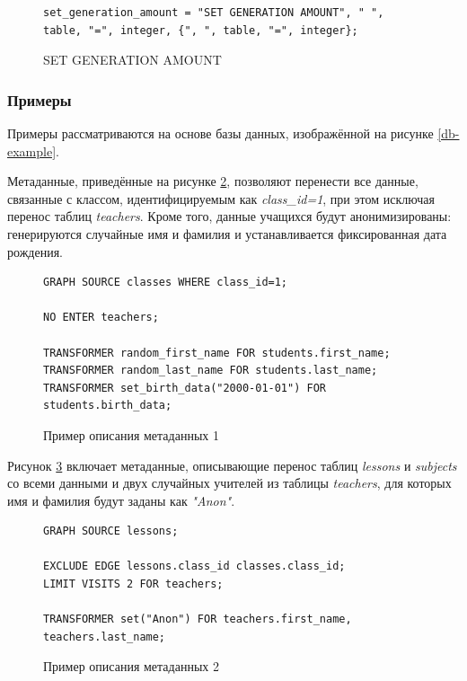 \begin{figure}
  \begin{lstlisting}
set_generation_amount = "SET GENERATION AMOUNT", " ", table, "=", integer, {", ", table, "=", integer};
  \end{lstlisting}
  \caption{SET GENERATION AMOUNT}
  \label{symbol-set-generation-amount}
\end{figure}

\subsubsection{Примеры}

Примеры рассматриваются на основе базы данных, изображённой на рисунке \ref{db-example}.

Метаданные, приведённые на рисунке \ref{metadata-example-1}, позволяют перенести все данные, связанные с классом, идентифицируемым как \textit{class\_id=1}, при этом исключая перенос таблиц \textit{teachers}. Кроме того, данные учащихся будут анонимизированы: генерируются случайные имя и фамилия и устанавливается фиксированная дата рождения.

\begin{figure}
  \begin{lstlisting}
GRAPH SOURCE classes WHERE class_id=1;

NO ENTER teachers;

TRANSFORMER random_first_name FOR students.first_name;
TRANSFORMER random_last_name FOR students.last_name;
TRANSFORMER set_birth_data("2000-01-01") FOR students.birth_data;
  \end{lstlisting}
  \caption{Пример описания метаданных 1}
  \label{metadata-example-1}
\end{figure}

Рисунок \ref{metadata-example-2} включает метаданные, описывающие перенос таблиц \textit{lessons} и \textit{subjects} со всеми данными и двух случайных учителей из таблицы \textit{teachers}, для которых имя и фамилия будут заданы как \textit{"Anon"}.

\begin{figure}
  \begin{lstlisting}
GRAPH SOURCE lessons;

EXCLUDE EDGE lessons.class_id classes.class_id;
LIMIT VISITS 2 FOR teachers;

TRANSFORMER set("Anon") FOR teachers.first_name, teachers.last_name;
  \end{lstlisting}
  \caption{Пример описания метаданных 2}
  \label{metadata-example-2}
\end{figure}

